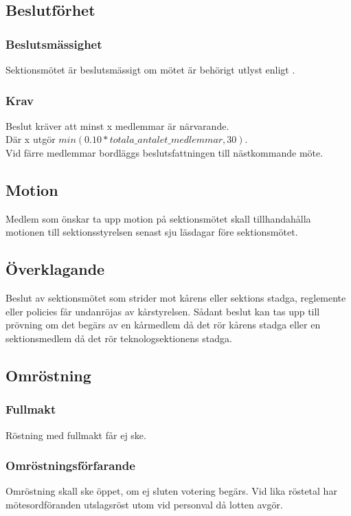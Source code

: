 \subsection{Beslutförhet}

\subsubsection{Beslutsmässighet}
Sektionsmötet är beslutsmässigt om mötet är behörigt utlyst enligt .

\subsubsection{Krav}
Beslut kräver att minst x medlemmar är närvarande. \\
Där x utgör $min(0.10 * totala\_antalet\_medlemmar, 30)$. \\
Vid färre medlemmar bordläggs beslutsfattningen till nästkommande möte.

\subsection{Motion}
Medlem som önskar ta upp motion på sektionsmötet skall tillhandahålla motionen till sektionsstyrelsen senast sju läsdagar före sektionsmötet.

\subsection{Överklagande}
Beslut av sektionsmötet som strider mot kårens eller sektions stadga, reglemente eller policies får undanröjas av kårstyrelsen. Sådant beslut kan tas upp till prövning om det begärs av en kårmedlem då det rör kårens stadga eller en sektionsmedlem då det rör teknologsektionens stadga.

\subsection{Omröstning}

\subsubsection{Fullmakt}
Röstning med fullmakt får ej ske.

\subsubsection{Omröstningsförfarande}
Omröstning skall ske öppet, om ej sluten votering begärs. Vid lika röstetal har mötesordföranden utslagsröst utom vid personval då lotten avgör.

